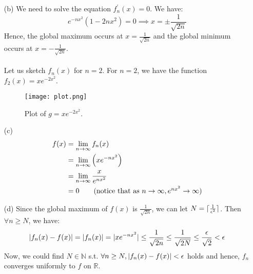 \documentclass[11pt]{article}
\DeclarePairedDelimiter\abs{\lvert}{\rvert}%
\DeclarePairedDelimiter{\ceil}{\lceil}{\rceil}
\newcommand{\nats}{\mathbb{N}}
\newcommand{\reals}{\mathbb{R}}
\begin{document}
\begin{itemize}
\begin{itemize}
            \item[(b)]
                We need to solve the equation $f^\prime_n(x) = 0$.
                We have:
                \begin{equation*}
                    e^{-nx^2}(1 - 2nx^2) = 0 \implies x = \pm \frac{1}{\sqrt{2n}}
                \end{equation*}
                Hence, the global maximum occurs at $x = \frac{1}{\sqrt{2n}}$
                and the global minimum occurs at $x = -\frac{1}{\sqrt{2n}}$.
                \\
                \\
                Let us sketch $f_n(x)$ for $n = 2$. For $n = 2$, we have the
                function $f_2(x) = xe^{-2x^2}$.
                \begin{figure}[H]
                    \centering
                    \texttt{[image: plot.png]}
                    \caption{Plot of $g = xe^{-2x^2}$.}
                \end{figure}

            \item[(c)]
                \begin{align*} 
                    f(x) &= \lim_{n \to \infty} f_n(x)\\
                         &= \lim_{n \to \infty} \Big(xe^{-nx^2}\Big)\\
                         &= \lim_{n \to \infty} \frac{x}{e^{nx^2}}\\
                         &= 0
                     \tag{notice that as $n \to \infty, e^{nx^2} \to \infty$}
                \end{align*} 

            \clearpage

            \item[(d)]
                Since the global maximum of $f(x)$ is $\frac{1}{\sqrt{2n}}$, we
                can let $N = \ceil{\frac{1}{\epsilon^2}}$. Then $\forall n \geq
                N$, we have:
                \begin{equation*}
                    \abs{f_n(x) - f(x)}
                        = \abs{f_n(x)}
                        = \abs{xe^{-nx^2}}
                        \leq \frac{1}{\sqrt{2n}}
                        \leq \frac{1}{\sqrt{2N}}
                        \leq \frac{\epsilon}{\sqrt{2}}
                        < \epsilon
                \end{equation*}
                Now, we could find $N \in \nats$ s.t. $\forall n \geq N,
                \abs{f_n(x) - f(x)} < \epsilon$ holds and hence, $f_n$
                converges uniformly to $f$ on $\reals$.


\end{itemize}
\end{itemize}
\end{document}
